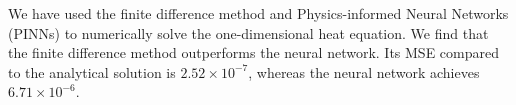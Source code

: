 
We have used the finite difference method and Physics-informed Neural Networks (PINNs) to numerically solve the one-dimensional heat equation. 
We find that the finite difference method outperforms the neural network. 
Its MSE compared to the analytical solution is $2.52 \times 10^{-7}$, whereas the neural network achieves $ 6.71 \times 10^{-6}$. 
